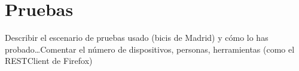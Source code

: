 \chapter{Pruebas}

Describir el escenario de pruebas usado (bicis de Madrid) y cómo lo has probado\dots Comentar el número de dispositivos, personas, herramientas (como el RESTClient de Firefox)